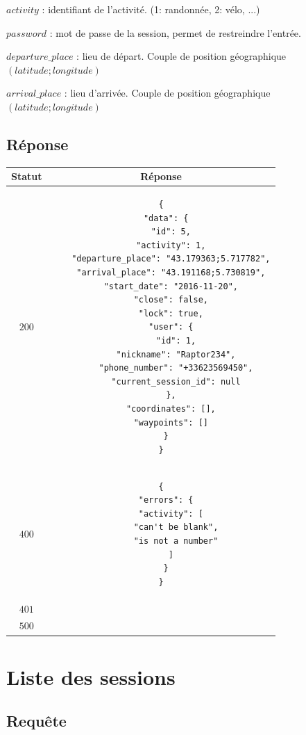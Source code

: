 \documentclass[titlepage, 12pt]{report}
\begin{document}
\par $ activity $ : identifiant de l'activité. (1: randonnée, 2: vélo, ...)
\par $ password $ : mot de passe de la session, permet de restreindre l'entrée.
\par $ departure\_place $ : lieu de départ. Couple de position géographique $(latitude;longitude)$
\par $ arrival\_place $ : lieu d'arrivée. Couple de position géographique $(latitude;longitude)$

\subsection{Réponse}

\begin{center}
	\begin{tabular}{|c|c|}
		\hline
		Statut & Réponse \\
		\hline
		$ 200 $ & \begin{lstlisting}
{
  "data": {
    "id": 5,
    "activity": 1,
    "departure_place": "43.179363;5.717782",
    "arrival_place": "43.191168;5.730819",
    "start_date": "2016-11-20",
    "close": false,
    "lock": true,
    "user": {
      "id": 1,
      "nickname": "Raptor234",
      "phone_number": "+33623569450",
      "current_session_id": null
    },
    "coordinates": [],
    "waypoints": []
  }
}
		\end{lstlisting} \\ 
		\hline
		$ 400 $ & \begin{lstlisting}
{
  "errors": {
    "activity": [
      "can't be blank",
      "is not a number"
    ]
  }
}
		\end{lstlisting} \\
		\hline
		$ 401 $ & \\
		\hline
		$ 500 $ & \\
		\hline
	\end{tabular}
\end{center}

%
%

\section{Liste des sessions}

\subsection{Requête}
\end{document}
